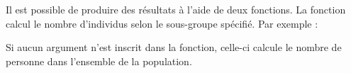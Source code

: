 \documentclass[letterpaper,10pt,french]{sphinxmanual}
\begin{document}

Il est possible de produire des résultats à l’aide de deux fonctions.
La fonction  calcul le nombre d’individus selon le sous-groupe spécifié. Par exemple :

\begin{sphinxVerbatim}[commandchars=\\\{\}]
\end{sphinxVerbatim}

Si aucun argument n’est inscrit dans la fonction, celle-ci calcule le nombre de personne dans l’ensemble de la population.

\end{document}
